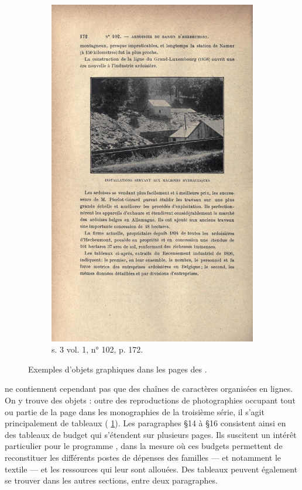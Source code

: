 \begin{figure}
\begin{subfigure}[t]{0.4\textwidth}
     \includegraphics[width=0.8\linewidth]{img/img_s3t1_m102_p172.png}
     \caption{s. 3 vol. 1, n° 102, p. 172.}
    \end{subfigure}
    \hspace{5pt}
    \caption[Exemples d'objets graphiques]{Exemples d'objets graphiques dans les pages des \odm{}.}
    \label{fig:ex_figures}
\end{figure}

\lodm{} ne contiennent cependant pas que des chaînes de caractères organisées en lignes. On y trouve des \og objets \fg{} : outre des reproductions de photographies occupant tout ou partie de la page dans les monographies de la troisième série, il s'agit principalement de tableaux (\fig{} \ref{fig:ex_figures}). Les paragraphes §14 à §16 consistent ainsi en des tableaux de budget qui s'étendent sur plusieurs pages. Ils suscitent un intérêt particulier pour le programme \timeus{}, dans la mesure où ces budgets permettent de reconstituer les différents postes de dépenses des familles --- et notamment le textile --- et les ressources qui leur sont allouées. Des tableaux peuvent également se trouver dans les autres sections, entre deux paragraphes.

